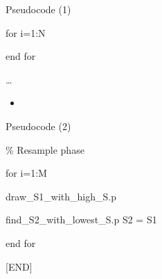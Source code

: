 \documentclass[compress]{beamer}
\begin{document}
\begin{frame}{Pseudocode (1)}
\begin{block}{for i=1:N}

\end{block}

\begin{block}{}

\end{block}

\begin{block}{end for}

\end{block}

\begin{block}{\ldots{}}

\begin{itemize}
\item ~
\end{itemize}

\end{block}

\end{frame}

\begin{frame}{Pseudocode (2)}

\begin{block}{\% Resample phase}

\end{block}

\begin{block}{for i=1:M}

\end{block}

\begin{block}{draw\_S1\_with\_high\_S.p}

\end{block}

\begin{block}{find\_S2\_with\_lowest\_S.p S2 = S1}

\end{block}

\begin{block}{end for}

\end{block}

\begin{block}{}

\end{block}

\begin{block}{{[}END{]}}

\end{block}

\begin{block}{}

\end{block}

\end{frame}
\end{document}
